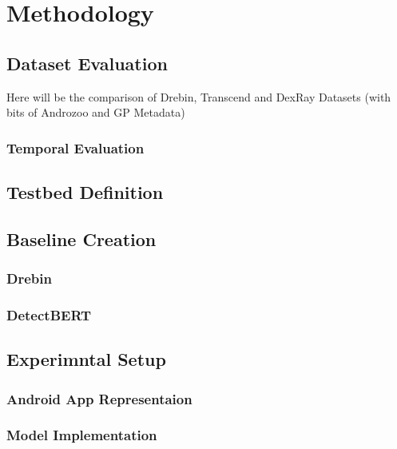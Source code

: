 \chapter{Methodology} %

\label{Methodology} %




\section{Dataset Evaluation}

Here will be the comparison of Drebin, Transcend and DexRay Datasets (with bits of Androzoo and GP Metadata)

\subsection{Temporal Evaluation}

\section{Testbed Definition}

\section{Baseline Creation}

\subsection{Drebin}

\subsection{DetectBERT}

\section{Experimntal Setup}

\subsection{Android App Representaion}

\subsection{Model Implementation}

